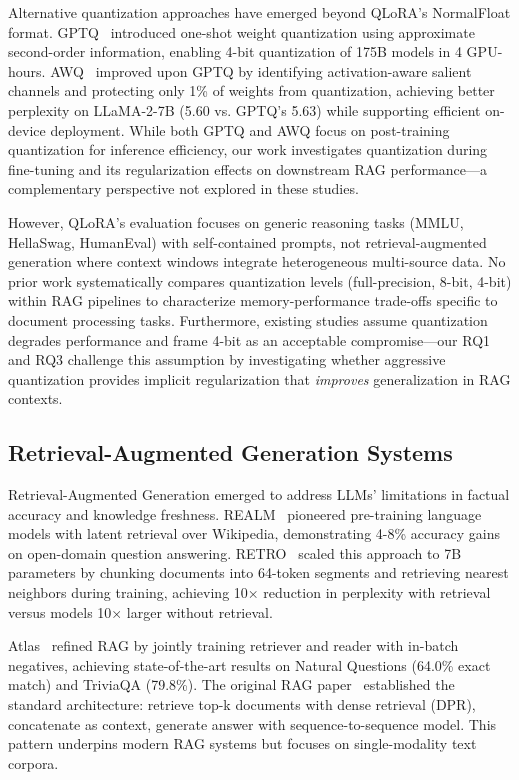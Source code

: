 \documentclass[pdflatex,sn-basic]{sn-jnl}
\begin{document}
Alternative quantization approaches have emerged beyond QLoRA's NormalFloat format. GPTQ~\citep{frantar2023gptq} introduced one-shot weight quantization using approximate second-order information, enabling 4-bit quantization of 175B models in 4 GPU-hours. AWQ~\citep{lin2024awq} improved upon GPTQ by identifying activation-aware salient channels and protecting only 1\% of weights from quantization, achieving better perplexity on LLaMA-2-7B (5.60 vs. GPTQ's 5.63) while supporting efficient on-device deployment. While both GPTQ and AWQ focus on post-training quantization for inference efficiency, our work investigates quantization during fine-tuning and its regularization effects on downstream RAG performance—a complementary perspective not explored in these studies.

However, QLoRA's evaluation focuses on generic reasoning tasks (MMLU, HellaSwag, HumanEval) with self-contained prompts, not retrieval-augmented generation where context windows integrate heterogeneous multi-source data. No prior work systematically compares quantization levels (full-precision, 8-bit, 4-bit) within RAG pipelines to characterize memory-performance trade-offs specific to document processing tasks. Furthermore, existing studies assume quantization degrades performance and frame 4-bit as an acceptable compromise—our RQ1 and RQ3 challenge this assumption by investigating whether aggressive quantization provides implicit regularization that \textit{improves} generalization in RAG contexts.

\subsection{Retrieval-Augmented Generation Systems}
\label{sec:related-rag}

Retrieval-Augmented Generation emerged to address LLMs' limitations in factual accuracy and knowledge freshness. REALM~\citep{guu2020realm} pioneered pre-training language models with latent retrieval over Wikipedia, demonstrating 4-8\% accuracy gains on open-domain question answering. RETRO~\citep{borgeaud2022retro} scaled this approach to 7B parameters by chunking documents into 64-token segments and retrieving nearest neighbors during training, achieving 10× reduction in perplexity with retrieval versus models 10× larger without retrieval.

Atlas~\citep{izacard2023atlas} refined RAG by jointly training retriever and reader with in-batch negatives, achieving state-of-the-art results on Natural Questions (64.0\% exact match) and TriviaQA (79.8\%). The original RAG paper~\citep{lewis2020rag} established the standard architecture: retrieve top-k documents with dense retrieval (DPR), concatenate as context, generate answer with sequence-to-sequence model. This pattern underpins modern RAG systems but focuses on single-modality text corpora.
\end{document}
